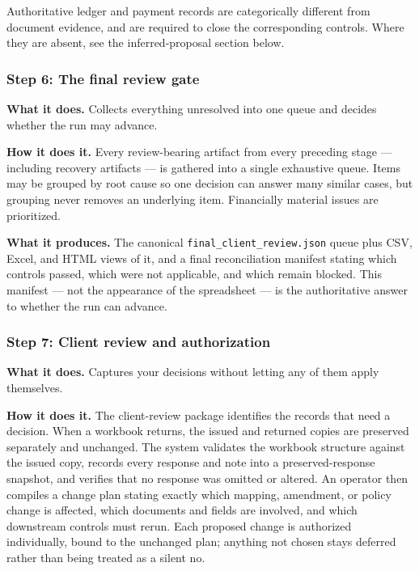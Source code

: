 \documentclass[
]{article}
\begin{document}
Authoritative ledger and payment records are categorically different
from document evidence, and are required to close the corresponding
controls. Where they are absent, see the inferred-proposal section
below.

\subsubsection{Step 6: The final review
gate}\label{step-6-the-final-review-gate}

\textbf{What it does.} Collects everything unresolved into one queue and
decides whether the run may advance.

\textbf{How it does it.} Every review-bearing artifact from every
preceding stage --- including recovery artifacts --- is gathered into a
single exhaustive queue. Items may be grouped by root cause so one
decision can answer many similar cases, but grouping never removes an
underlying item. Financially material issues are prioritized.

\textbf{What it produces.} The canonical
\texttt{final\_\allowbreak{}client\_\allowbreak{}review.json} queue plus
CSV, Excel, and HTML views of it, and a final reconciliation manifest
stating which controls passed, which were not applicable, and which
remain blocked. This manifest --- not the appearance of the spreadsheet
--- is the authoritative answer to whether the run can advance.

\subsubsection{Step 7: Client review and
authorization}\label{step-7-client-review-and-authorization}

\textbf{What it does.} Captures your decisions without letting any of
them apply themselves.

\textbf{How it does it.} The client-review package identifies the
records that need a decision. When a workbook returns, the issued and
returned copies are preserved separately and unchanged. The system
validates the workbook structure against the issued copy, records every
response and note into a preserved-response snapshot, and verifies that
no response was omitted or altered. An operator then compiles a change
plan stating exactly which mapping, amendment, or policy change is
affected, which documents and fields are involved, and which downstream
controls must rerun. Each proposed change is authorized individually,
bound to the unchanged plan; anything not chosen stays deferred rather
than being treated as a silent no.
\end{document}
